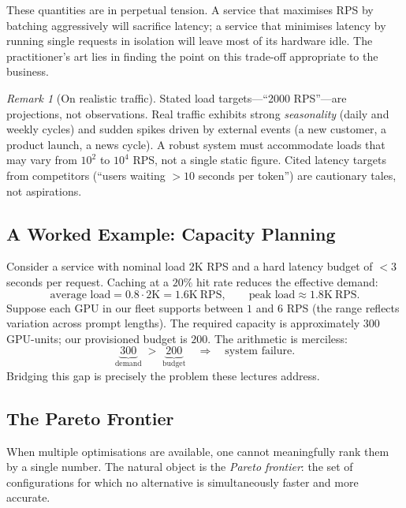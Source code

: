 \documentclass[11pt,a4paper]{article}
\theoremstyle{definition}
\theoremstyle{remark}
\newtheorem*{remark}{Remark}
\theoremstyle{plain}
\begin{document}
These quantities are in perpetual tension. A service that maximises RPS by
batching aggressively will sacrifice latency; a service that minimises
latency by running single requests in isolation will leave most of its
hardware idle. The practitioner's art lies in finding the point on this
trade-off appropriate to the business.

\begin{remark}[On realistic traffic]
Stated load targets---``2000 RPS''---are projections, not observations.
Real traffic exhibits strong \emph{seasonality} (daily and weekly cycles)
and sudden spikes driven by external events (a new customer, a product
launch, a news cycle). A robust system must accommodate loads that may
vary from $10^2$ to $10^4$ RPS, not a single static figure. Cited latency
targets from competitors (``users waiting $>10$ seconds per token'') are
cautionary tales, not aspirations.
\end{remark}

\subsection{A Worked Example: Capacity Planning}

Consider a service with nominal load $2\text{K}$ RPS and a hard latency
budget of $<3$ seconds per request. Caching at a $20\%$ hit rate reduces
the effective demand:
\[
\text{average load} = 0.8 \cdot 2\text{K} = 1.6\text{K}~\text{RPS}, \qquad
\text{peak load} \approx 1.8\text{K}~\text{RPS}.
\]
Suppose each GPU in our fleet supports between $1$ and $6$ RPS (the range
reflects variation across prompt lengths). The required capacity is
approximately $300$ GPU-units; our provisioned budget is $200$. The
arithmetic is merciless:
\[
\underbrace{300}_{\text{demand}} \;>\; \underbrace{200}_{\text{budget}}
\quad\Longrightarrow\quad \text{system failure}.
\]
Bridging this gap is precisely the problem these lectures address.

\subsection{The Pareto Frontier}

When multiple optimisations are available, one cannot meaningfully rank
them by a single number. The natural object is the \emph{Pareto
frontier}: the set of configurations for which no alternative is
simultaneously faster and more accurate.
\end{document}

